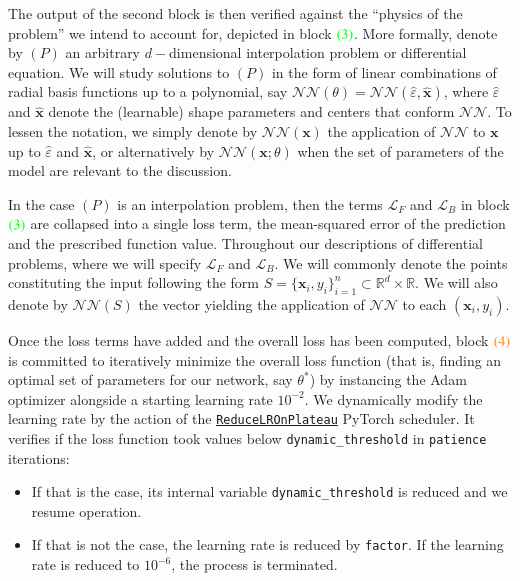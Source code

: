 \documentclass[12pt]{report} %
\newcommand{\tmmathbf}[1]{\ensuremath{\boldsymbol{#1}}}
\newcommand{\tmcolor}[2]{{\color{#1}{#2}}}
\begin{document}
The output of the second block is then verified against the ``physics of the problem'' we intend to account for, depicted in block $\tmcolor{green}{(3)}$. More formally, denote by $(P)$  an arbitrary $d-$dimensional interpolation problem or differential equation. We will study solutions to $(P)$ in the form of linear combinations of radial basis functions up to a polynomial, say $\mathcal{NN}(\theta) = \mathcal{NN}(\hat{\varepsilon}, \hat{\tmmathbf{x}})$, where $\hat{\varepsilon}$ and $\hat{\tmmathbf{x}}$ denote the (learnable) shape parameters and centers that conform $\mathcal{NN}$. To lessen the notation, we simply denote by $\mathcal{NN}(\tmmathbf{x})$ the application of $\mathcal{NN}$ to $\tmmathbf{x}$ up to $\hat{\varepsilon}$ and $\hat{\tmmathbf{x}}$, or alternatively by $\mathcal{NN}(\tmmathbf{x};\theta)$ when the set of parameters of the model are relevant to the discussion.

In the case $(P)$ is an interpolation problem, then the terms $\mathcal{L}_F$ and $\mathcal{L}_B$ in block $\tmcolor{green}{(3)}$ are collapsed into a single loss term, the mean-squared error of the prediction and the prescribed function value. Throughout our descriptions of differential problems, where we will specify $\mathcal{L}_F$ and $\mathcal{L}_B$. 
We will commonly denote the points constituting the input following the form $S = \{\tmmathbf{x}_i, y_i\}_{i=1}^n \subset \mathbb{R}^d \times \mathbb{R}$. We will also denote by $\mathcal{NN}(S)$ the vector yielding the application of $\mathcal{NN}$ to each $(\tmmathbf{x}_i, y_i)$. %


Once the loss terms have added and the overall loss has been computed, block $\tmcolor{orange}{(4)}$ is committed to iteratively minimize the overall loss function (that is, finding an optimal set of parameters for our network, say $\theta^\ast$) by instancing the Adam optimizer alongside a starting learning rate $10^{-2}$. We dynamically modify the learning rate by the action of the \href{https://pytorch.org/docs/stable/generated/torch.optim.lr_scheduler.ReduceLROnPlateau.html}{\texttt{ReduceLROnPlateau}} PyTorch scheduler. It verifies if the loss function took values below \texttt{dynamic\_threshold} in \texttt{patience} iterations:
\begin{itemize}
  \item If that is the case, its internal variable \texttt{dynamic\_threshold} is reduced and we resume operation.
  \item If that is not the case, the learning rate is reduced by \texttt{factor}. If the learning rate is reduced to $10^{-6}$, the process is terminated.
\end{itemize}
\end{document}
